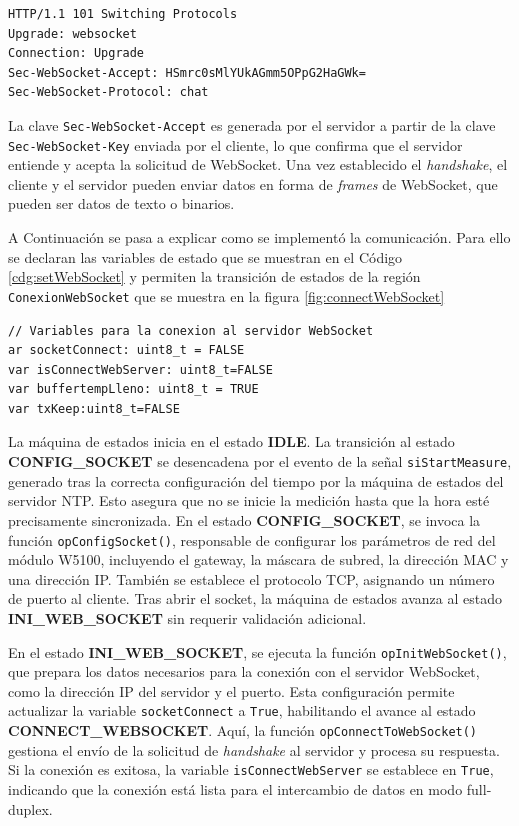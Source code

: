 \begin{verbatim}
HTTP/1.1 101 Switching Protocols
Upgrade: websocket
Connection: Upgrade
Sec-WebSocket-Accept: HSmrc0sMlYUkAGmm5OPpG2HaGWk=
Sec-WebSocket-Protocol: chat
\end{verbatim}

La clave \texttt{Sec-WebSocket-Accept} es generada por el servidor a partir de la clave \texttt{Sec-WebSocket-Key} enviada por el cliente, lo que confirma que el servidor entiende y acepta la solicitud de WebSocket. Una vez establecido el \textit{handshake}, el cliente y el servidor pueden enviar datos en forma de \textit{frames} de WebSocket, que pueden ser datos de texto o binarios.

A Continuación se pasa a explicar como se implementó la comunicación. Para ello se declaran las variables de estado que se muestran en el Código \ref{cdg:setWebSocket} y permiten la transición de estados de la región \texttt{ConexionWebSocket} que se muestra en la figura \ref{fig:connectWebSocket}

\begin{lstlisting}[style=yakindustyle, caption={Declaración de variables booleanas para validar la conexion con el servidor WebSocket.}, label=cdg:setWebSocket,basicstyle=\ttfamily\fontsize{8}{8}\selectfont]
// Variables para la conexion al servidor WebSocket
ar socketConnect: uint8_t = FALSE
var isConnectWebServer: uint8_t=FALSE
var buffertempLleno: uint8_t = TRUE
var txKeep:uint8_t=FALSE
\end{lstlisting}

La máquina de estados inicia en el estado \textbf{IDLE}. La transición al estado \textbf{CONFIG\_SOCKET} se desencadena por el evento de la señal \texttt{siStartMeasure}, generado tras la correcta configuración del tiempo por la máquina de estados del servidor NTP. Esto asegura que no se inicie la medición hasta que la hora esté precisamente sincronizada. En el estado \textbf{CONFIG\_SOCKET}, se invoca la función \texttt{opConfigSocket()}, responsable de configurar los parámetros de red del módulo W5100, incluyendo el gateway, la máscara de subred, la dirección MAC y una dirección IP. También se establece el protocolo TCP, asignando un número de puerto al cliente. Tras abrir el socket, la máquina de estados avanza al estado \textbf{INI\_WEB\_SOCKET} sin requerir validación adicional.

En el estado \textbf{INI\_WEB\_SOCKET}, se ejecuta la función \texttt{opInitWebSocket()}, que prepara los datos necesarios para la conexión con el servidor WebSocket, como la dirección IP del servidor y el puerto. Esta configuración permite actualizar la variable \texttt{socketConnect} a \texttt{True}, habilitando el avance al estado \textbf{CONNECT\_WEBSOCKET}. Aquí, la función \texttt{opConnectToWebSocket()} gestiona el envío de la solicitud de \textit{handshake} al servidor y procesa su respuesta. Si la conexión es exitosa, la variable \texttt{isConnectWebServer} se establece en \texttt{True}, indicando que la conexión está lista para el intercambio de datos en modo full-duplex.

